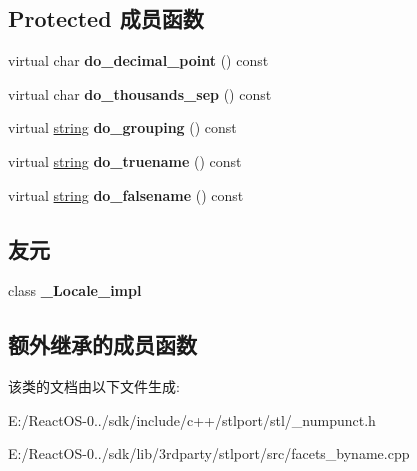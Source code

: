 \subsection*{Protected 成员函数}
\begin{DoxyCompactItemize}
\item 
\mbox{\label{classnumpunct__byname_3_01char_01_4_ab73f83ebee2d5f4b777c704d35ad7d53}} 
virtual char {\bfseries do\+\_\+decimal\+\_\+point} () const
\item 
\mbox{\label{classnumpunct__byname_3_01char_01_4_a0875e1449a0c6caa86920fcf63fea514}} 
virtual char {\bfseries do\+\_\+thousands\+\_\+sep} () const
\item 
\mbox{\label{classnumpunct__byname_3_01char_01_4_ac23c5924787b407cbbeec0a50cf5db84}} 
virtual \hyperlink{structstring}{string} {\bfseries do\+\_\+grouping} () const
\item 
\mbox{\label{classnumpunct__byname_3_01char_01_4_ad862048f3e1cdac17b190749a0bc98d1}} 
virtual \hyperlink{structstring}{string} {\bfseries do\+\_\+truename} () const
\item 
\mbox{\label{classnumpunct__byname_3_01char_01_4_ac7bdf8f5ea762fb9163810b1cfb1676f}} 
virtual \hyperlink{structstring}{string} {\bfseries do\+\_\+falsename} () const
\end{DoxyCompactItemize}
\subsection*{友元}
\begin{DoxyCompactItemize}
\item 
\mbox{\label{classnumpunct__byname_3_01char_01_4_ae9c09ac7cd16ad35f8fdb1587ac77eb8}} 
class {\bfseries \+\_\+\+Locale\+\_\+impl}
\end{DoxyCompactItemize}
\subsection*{额外继承的成员函数}


该类的文档由以下文件生成\+:\begin{DoxyCompactItemize}
\item 
E\+:/\+React\+O\+S-\/0../sdk/include/c++/stlport/stl/\+\_\+numpunct.\+h\item 
E\+:/\+React\+O\+S-\/0../sdk/lib/3rdparty/stlport/src/facets\+\_\+byname.\+cpp\end{DoxyCompactItemize}
